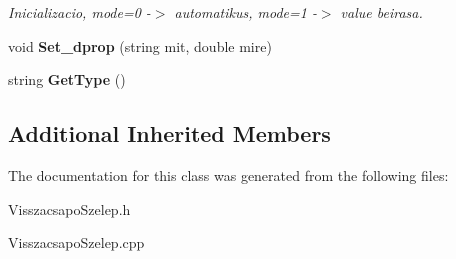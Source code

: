 \begin{DoxyCompactItemize}
\begin{DoxyCompactList}\small\item\em Inicializacio, mode=0 -\/$>$ automatikus, mode=1 -\/$>$ value beirasa. \end{DoxyCompactList}\item 
void {\bfseries Set\+\_\+dprop} (string mit, double mire)\hypertarget{class_visszacsapo_szelep_a926e1eca26c657b4a7c2a6ac90c78729}{}\label{class_visszacsapo_szelep_a926e1eca26c657b4a7c2a6ac90c78729}

\item 
string {\bfseries Get\+Type} ()\hypertarget{class_visszacsapo_szelep_aa30043b601103db38fec768e510c3ebe}{}\label{class_visszacsapo_szelep_aa30043b601103db38fec768e510c3ebe}

\end{DoxyCompactItemize}
\subsection*{Additional Inherited Members}


The documentation for this class was generated from the following files\+:\begin{DoxyCompactItemize}
\item 
Visszacsapo\+Szelep.\+h\item 
Visszacsapo\+Szelep.\+cpp\end{DoxyCompactItemize}
